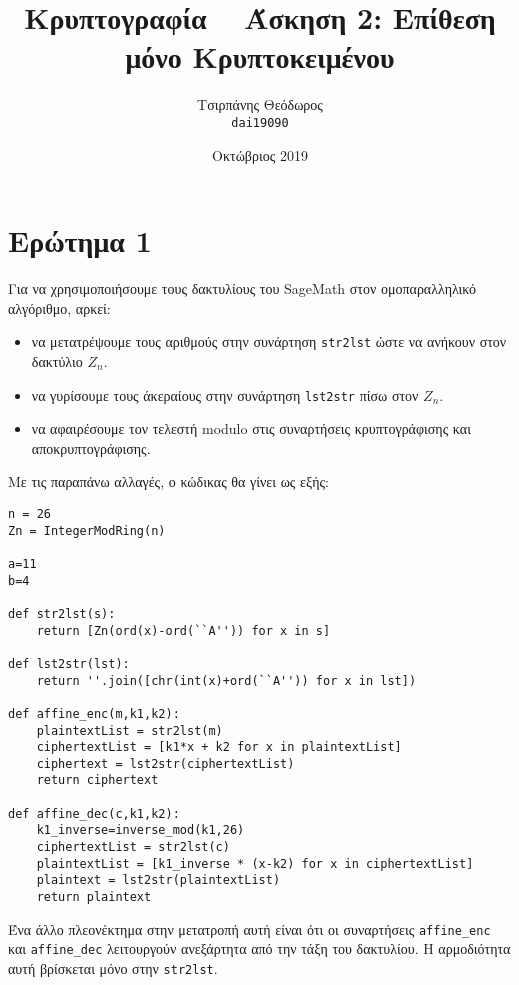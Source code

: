 \documentclass{article}
\title{Κρυπτογραφία ~ Άσκηση 2: Επίθεση μόνο Κρυπτοκειμένου}
\author{Τσιρπάνης Θεόδωρος\\ \texttt{dai19090}}
\date{Οκτώβριος 2019}
\begin{document}
\maketitle

\section{Ερώτημα 1}

Για να χρησιμοποιήσουμε τους δακτυλίους του SageMath στον ομοπαραλληλικό αλγόριθμο, αρκεί:

\begin{itemize}
\item να μετατρέψουμε τους αριθμούς στην συνάρτηση \lstinline|str2lst| ώστε να ανήκουν στον δακτύλιο $Z_n$.

\item να γυρίσουμε τους άκεραίους στην συνάρτηση \lstinline|lst2str| πίσω στον $Z_n$.

\item να αφαιρέσουμε τον τελεστή modulo στις συναρτήσεις κρυπτογράφισης και αποκρυπτογράφισης.
\end{itemize}


Με τις παραπάνω αλλαγές, ο κώδικας θα γίνει ως εξής:

\begin{lstlisting}[caption=Ο κώδικας στο SageMath]
n = 26
Zn = IntegerModRing(n)

a=11
b=4

def str2lst(s):
    return [Zn(ord(x)-ord(``A'')) for x in s]

def lst2str(lst):
    return ''.join([chr(int(x)+ord(``A'')) for x in lst])

def affine_enc(m,k1,k2):
    plaintextList = str2lst(m)
    ciphertextList = [k1*x + k2 for x in plaintextList]
    ciphertext = lst2str(ciphertextList)
    return ciphertext

def affine_dec(c,k1,k2):
    k1_inverse=inverse_mod(k1,26)
    ciphertextList = str2lst(c)
    plaintextList = [k1_inverse * (x-k2) for x in ciphertextList]
    plaintext = lst2str(plaintextList)
    return plaintext
\end{lstlisting}

Ένα άλλο πλεονέκτημα στην μετατροπή αυτή είναι ότι οι συναρτήσεις \lstinline|affine_enc| και \lstinline|affine_dec| λειτουργούν ανεξάρτητα από την τάξη του δακτυλίου. Η αρμοδιότητα αυτή βρίσκεται μόνο στην \lstinline|str2lst|.
\end{document}
